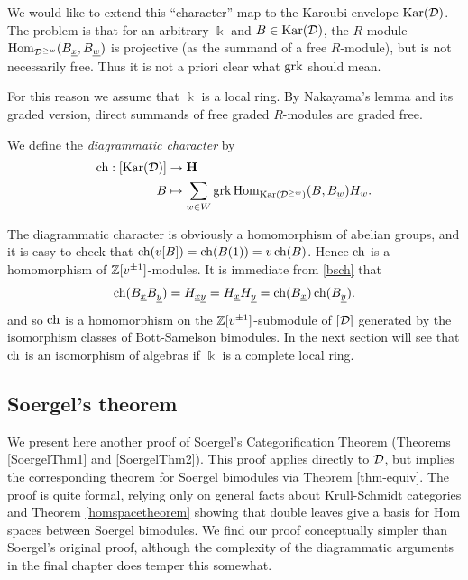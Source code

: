 We would like to extend this ``character'' map to the Karoubi envelope $\textrm{Kar}({\mathcal{D}})$. The problem is that for an arbitrary $\Bbbk$ and $B \in \textrm{Kar}({\mathcal{D}})$, the $R$-module $\operatorname{Hom}_{{\mathcal{D}}^{\ge w}}(B_{\underline{x}}, B_{\underline{w}})$ is projective (as the summand of a free $R$-module), but is not necessarily free. Thus it is not a priori clear what $\operatorname{grk}$ should mean.

For this reason we assume that $\Bbbk$ is a local ring. By Nakayama's lemma and its graded version, direct summands of free graded $R$-modules are graded free.

\begin{defn}
We define the \emph{diagrammatic character} by
\begin{align*}
\operatorname{ch} : [\textrm{Kar}({\mathcal{D}})] & \rightarrow {\mathbf H} \\
B & \mapsto \sum_{w \in W} \operatorname{grk} \operatorname{Hom}_{\textrm{Kar}({\mathcal{D}}^{\ge w})}(B, B_{\underline{w}})H_w.
\end{align*} 
\end{defn}

The diagrammatic character is obviously a homomorphism of abelian groups, and it is easy to check that
$\operatorname{ch}(v[B]) = \operatorname{ch}(B(1)) = v\operatorname{ch}(B)$. 
Hence $\operatorname{ch}$ is a homomorphism of ${\mathbb{Z}}[v^{\pm 1}]$-modules. It is immediate from \eqref{bsch} that
\begin{equation} \label{eq:chhom}
\operatorname{ch}(B_{\underline{x}}B_{\underline{y}}) = H_{\underline{x}\underline{y}} = H_{\underline{x}}H_{\underline{y}} = \operatorname{ch}(B_{\underline{x}})\operatorname{ch}(B_{\underline{y}}).
\end{equation}
and so $\operatorname{ch}$ is a homomorphism on the ${\mathbb{Z}}[v^{\pm 1}]$-submodule of $[{\mathcal{D}}]$ generated by the isomorphism classes of Bott-Samelson bimodules.  In the next section will see that $\operatorname{ch}$ is an isomorphism of algebras if $\Bbbk$ is a complete local ring.


\subsection{Soergel's theorem}
\label{subsec-SThmDiag}

We present here another proof of Soergel's Categorification Theorem (Theorems \ref{SoergelThm1} and \ref{SoergelThm2}). This proof applies directly to ${\mathcal{D}}$, but implies the corresponding theorem for Soergel bimodules via Theorem \ref{thm-equiv}. The proof is quite formal, relying only on general facts about Krull-Schmidt categories and Theorem \ref{homspacetheorem} showing that double leaves give a basis for Hom spaces between Soergel bimodules. We find our proof conceptually simpler than Soergel's original proof, although the complexity of the diagrammatic arguments in the final chapter does temper this somewhat.

